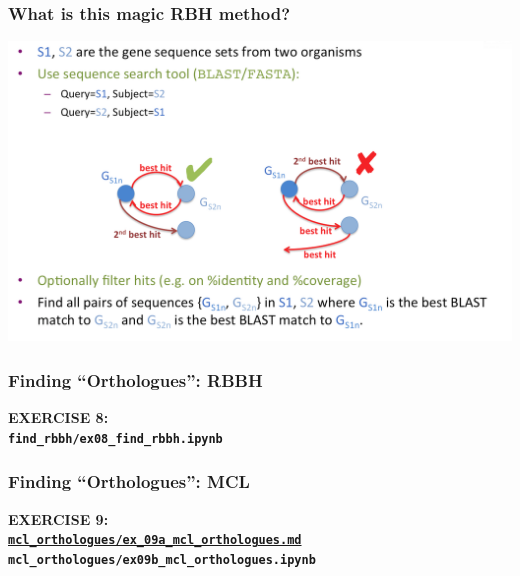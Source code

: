 \begin{frame}
  \frametitle{What is this magic RBH method?}
  \begin{center}
      \includegraphics[width=1\textwidth]{images/rbbh}      
  \end{center}
\end{frame}

%
\begin{frame}
  \frametitle{Finding ``Orthologues'': RBBH}
  \Large{
    \textcolor{hutton_blue}{
      \textbf{
      EXERCISE 8: \\
      \texttt{find\_rbbh/ex08\_find\_rbbh.ipynb}
      }
    }
  }
\end{frame}

%
\begin{frame}
  \frametitle{Finding ``Orthologues'': MCL}
  \Large{
    \textcolor{hutton_blue}{
      \textbf{
      EXERCISE 9: \\
      {\small \href{https://github.com/widdowquinn/Teaching-2015-03-17-UoD_compgenvis/blob/master/exercises/mcl_orthologues/ex09a_mcl_orthologues.md}{\texttt{mcl\_orthologues/ex\_09a\_mcl\_orthologues.md}} \\
      \texttt{mcl\_orthologues/ex09b\_mcl\_orthologues.ipynb}}
      }
    }
  }
\end{frame}